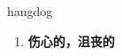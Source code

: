 
\begin{frame}
{\huge hangdog}
\begin{center}
\begin{enumerate}\Large
  \item \textbf{伤心的，沮丧的}
\end{enumerate}
\end{center}
\end{frame}

